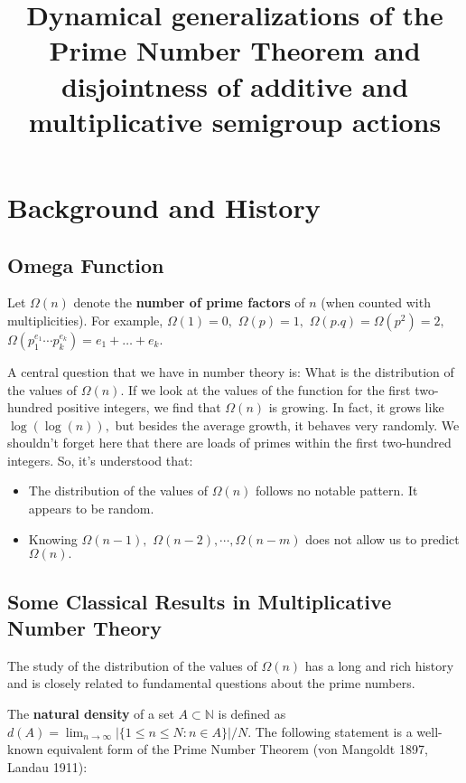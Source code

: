 \documentclass{article}
\title{Dynamical generalizations of the Prime Number Theorem and disjointness of additive and multiplicative semigroup actions}
\begin{document}
\maketitle

\section{Background and History}

\subsection{Omega Function}

Let $\Omega(n)$ denote the \textbf{number of prime factors} of $n$ (when counted with multiplicities). For example, $\Omega(1)=0,$ $\Omega(p)=1,$ $\Omega(p.q)=\Omega(p^2)=2,$ $\Omega(p_1^{e_1}\cdots p_k^{e_k})=e_1 + \dots + e_k.$

A central question that we have in number theory is: What is the distribution of the values of $\Omega(n).$ If we look at the values of the function for the first two-hundred positive integers, we find that $\Omega(n)$ is growing. In fact, it grows like $\log(\log(n)),$ but besides the average growth, it behaves very randomly. We shouldn't forget here that there are loads of primes within the first two-hundred integers. So, it's understood that:

\begin{itemize}
    \item The distribution of the values of $\Omega(n)$ follows no notable pattern. It appears to be random.
    \item Knowing $\Omega(n-1),$ $\Omega(n-2),\cdots, \Omega(n-m)$ does not allow us to predict $\Omega(n).$
\end{itemize}

\subsection{Some Classical Results in Multiplicative Number Theory}

The study of the distribution of the values of $\Omega(n)$ has a long and rich history and is closely related to fundamental questions about the prime numbers.

The \textbf{natural density} of a set $A \subset \mathbb{N}$ is defined as $d(A)=\lim_{n \to \infty}|\{1 \le n \le N : n \in A\}|/N.$ The following statement is a well-known equivalent form of the Prime Number Theorem (von Mangoldt 1897, Landau 1911): 
\end{document}
